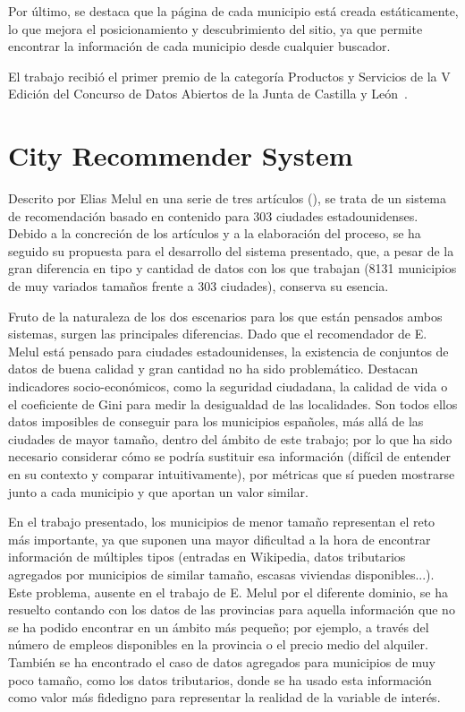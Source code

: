 Por último, se destaca que la página de cada municipio está creada estáticamente, lo que mejora el posicionamiento y descubrimiento del sitio, ya que permite encontrar la información de cada municipio desde cualquier buscador.

El trabajo recibió el primer premio de la categoría Productos y Servicios de la V Edición del Concurso de Datos Abiertos de la Junta de Castilla y León~\cite{cyl}.

\section{City Recommender System}

Descrito por Elias Melul en una serie de tres artículos (\cite{US1, US2, US3}), se trata de un sistema de recomendación basado en contenido para 303 ciudades estadounidenses. Debido a la concreción de los artículos y a la elaboración del proceso, se ha seguido su propuesta para el desarrollo del sistema presentado, que, a pesar de la gran diferencia en tipo y cantidad de datos con los que trabajan (8131 municipios de muy variados tamaños frente a 303 ciudades), conserva su esencia.

Fruto de la naturaleza de los dos escenarios para los que están pensados ambos sistemas, surgen las principales diferencias. Dado que el recomendador de E. Melul está pensado para ciudades estadounidenses, la existencia de conjuntos de datos de buena calidad y gran cantidad no ha sido problemático. Destacan indicadores socio-económicos, como la seguridad ciudadana, la calidad de vida o el coeficiente de Gini para medir la desigualdad de las localidades. Son todos ellos datos imposibles de conseguir para los municipios españoles, más allá de las ciudades de mayor tamaño, dentro del ámbito de este trabajo; por lo que ha sido necesario considerar cómo se podría sustituir esa información (difícil de entender en su contexto y comparar intuitivamente), por métricas que sí pueden mostrarse junto a cada municipio y que aportan un valor similar.

En el trabajo presentado, los municipios de menor tamaño representan el reto más importante, ya que suponen una mayor dificultad a la hora de encontrar información de múltiples tipos (entradas en Wikipedia, datos tributarios agregados por municipios de similar tamaño, escasas viviendas disponibles...). Este problema, ausente en el trabajo de E. Melul por el diferente dominio, se ha resuelto contando con los datos de las provincias para aquella información que no se ha podido encontrar en un ámbito más pequeño; por ejemplo, a través del número de empleos disponibles en la provincia o el precio medio del alquiler. También se ha encontrado el caso de datos agregados para municipios de muy poco tamaño, como los datos tributarios, donde se ha usado esta información como valor más fidedigno para representar la realidad de la variable de interés.

